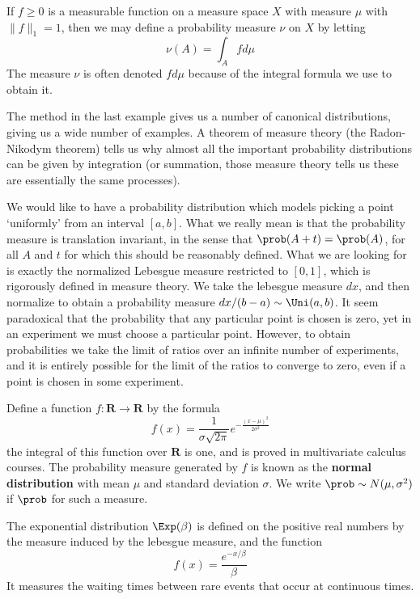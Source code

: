 \begin{example}
    If $f \geq 0$ is a measurable function on a measure space $X$ with measure $\mu$ with $\| f \|_1 = 1$, then we may define a probability measure $\nu$ on $X$ by letting
    \[ \nu(A) = \int_A f d\mu \]
    The measure $\nu$ is often denoted $f d\mu$ because of the integral formula we use to obtain it.
\end{example}

The method in the last example gives us a number of canonical distributions, giving us a wide number of examples. A theorem of measure theory (the Radon-Nikodym theorem) tells us why almost all the important probability distributions can be given by integration (or summation, those measure theory tells us these are essentially the same processes).

\begin{example}
    We would like to have a probability distribution which models picking a point `uniformly' from an interval $[a,b]$. What we really mean is that the probability measure is translation invariant, in the sense that $\prob(A + t) = \prob(A)$, for all $A$ and $t$ for which this should be reasonably defined. What we are looking for is exactly the normalized Lebesgue measure restricted to $[0,1]$, which is rigorously defined in measure theory. We take the lebesgue measure $dx$, and then normalize to obtain a probability measure $dx/(b-a) \sim \Uni(a,b)$. It seem paradoxical that the probability that any particular point is chosen is zero, yet in an experiment we must choose a particular point. However, to obtain probabilities we take the limit of ratios over an infinite number of experiments, and it is entirely possible for the limit of the ratios to converge to zero, even if a point is chosen in some experiment.
\end{example}

\begin{example}
    Define a function $f:\mathbf{R} \to \mathbf{R}$ by the formula
    \[ f(x) = \frac{1}{\sigma \sqrt{2\pi}} e^{-\frac{(x - \mu)^2}{2\sigma^2}} \]
    the integral of this function over $\mathbf{R}$ is one, and is proved in multivariate calculus courses. The probability measure generated by $f$ is known as the {\bf normal distribution} with mean $\mu$ and standard deviation $\sigma$. We write $\prob \sim N(\mu, \sigma^2)$ if $\prob$ for such a measure.
\end{example}

\begin{example}
    The exponential distribution $\Exp(\beta)$ is defined on the positive real numbers by the measure induced by the lebesgue measure, and the function
    \[ f(x) = \frac{e^{-x/\beta}}{\beta} \]
    It measures the waiting times between rare events that occur at continuous times.
\end{example}

